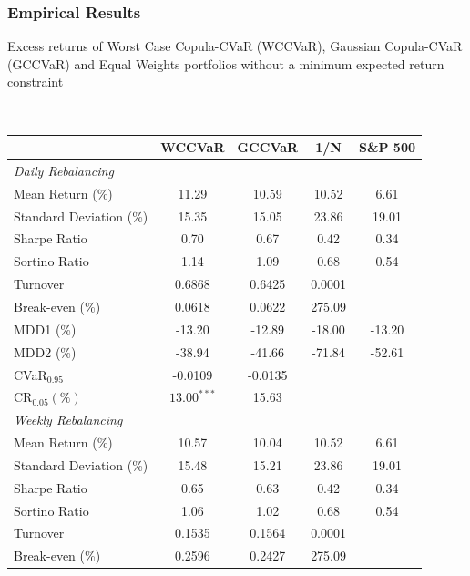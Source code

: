 \documentclass[pdf,10pt,xcolor=dvipsnames,hide notes]{beamer}
\begin{document}
\begin{frame}
	\frametitle{Empirical Results}
	
	
	\begin{threeparttable}[H]
		\caption{Excess returns of Worst Case Copula-CVaR (WCCVaR), Gaussian Copula-CVaR (GCCVaR) and Equal Weights portfolios without a minimum expected return constraint}
		\label{tab:tabletwo}\centering
		\tiny \
		\begin{tabularx}{\textwidth}{@{\extracolsep{\fill}}lcccc@{}}
			\toprule & \textbf{WCCVaR} & \textbf{GCCVaR} & \textbf{1/N} & \textbf{S\&P 500%
			} \\
			\midrule[\heavyrulewidth] \textit{Daily Rebalancing} &  &  &  &  \\
			\midrule[\heavyrulewidth] Mean Return (\%) & \cellcolor{corn} 11.29 & 10.59 & 10.52 & 6.61
			\\
			Standard Deviation (\%) & 15.35 & \cellcolor{celadon} 15.05 & 23.86 & 19.01 \\
			Sharpe Ratio & \cellcolor{corn} 0.70 & 0.67 & 0.42 & 0.34 \\
			Sortino Ratio & 1.14 & 1.09 & 0.68 & 0.54 \\
			Turnover & 0.6868 & 0.6425 & 0.0001 &  \\
			Break-even (\%) & 0.0618 & 0.0622 & 275.09 &  \\
			MDD1 (\%) & -13.20 & \cellcolor{celadon} -12.89 & -18.00 & -13.20 \\
			MDD2 (\%) & \cellcolor{corn} -38.94 & -41.66 & -71.84 & -52.61 \\
			CVaR$_{0.95}$ & \cellcolor{corn} -0.0109 & -0.0135 &  &  \\
			CR$_{0.05} (\%)$ & \cellcolor{corn} $13.00^{***}$ & 15.63 &  &  \\
			\midrule[\heavyrulewidth] \textit{Weekly Rebalancing} &  &  &  &  \\
			\midrule[\heavyrulewidth] Mean Return (\%) & 10.57 & 10.04 & 10.52 & 6.61
			\\
			Standard Deviation (\%) & 15.48 & 15.21 & 23.86 & 19.01 \\
			Sharpe Ratio & 0.65 & 0.63 & 0.42 & 0.34 \\
			Sortino Ratio & 1.06 & 1.02 & 0.68 & 0.54 \\
			Turnover & 0.1535 & 0.1564 & 0.0001 &  \\
			Break-even (\%) & \cellcolor{corn} 0.2596 & 0.2427 & 275.09 &  \\

\end{tabularx}
\end{threeparttable}
\end{frame}
\end{document}
